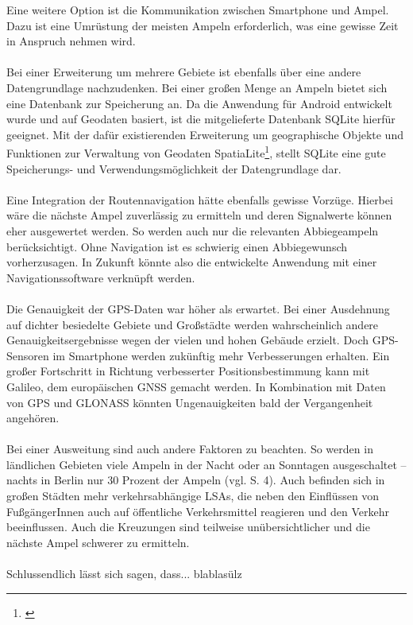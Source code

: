 Eine weitere Option ist die Kommunikation zwischen \gls{Smartphone} und Ampel. Dazu ist eine Umrüstung der meisten Ampeln erforderlich, was eine gewisse Zeit in Anspruch nehmen wird. \cite{smart_lsa}\\\\
Bei einer Erweiterung um mehrere Gebiete ist ebenfalls über eine andere Datengrundlage nachzudenken. Bei einer großen Menge an Ampeln bietet sich eine Datenbank zur Speicherung an.
Da die Anwendung für Android entwickelt wurde und auf Geodaten basiert, ist die mitgelieferte Datenbank SQLite hierfür geeignet. Mit der dafür existierenden Erweiterung um geographische Objekte und Funktionen zur Verwaltung von Geodaten SpatiaLite\footnote{\cite{sparta}}, stellt SQLite eine gute Speicherungs- und Verwendungsmöglichkeit der Datengrundlage dar.\\\\
Eine Integration der Routennavigation hätte ebenfalls gewisse Vorzüge. Hierbei wäre die nächste Ampel zuverlässig zu ermitteln und deren Signalwerte können eher ausgewertet werden. So werden auch nur die relevanten Abbiegeampeln berücksichtigt. Ohne Navigation ist es schwierig einen Abbiegewunsch vorherzusagen. In Zukunft könnte also die entwickelte Anwendung mit einer Navigationssoftware verknüpft werden.\\\\
Die Genauigkeit der \gls{GPS}-Daten war höher als erwartet. Bei einer Ausdehnung auf dichter besiedelte Gebiete und Großstädte werden wahrscheinlich andere Genauigkeitsergebnisse wegen der vielen und hohen Gebäude erzielt. Doch \gls{GPS}-Sensoren im \gls{Smartphone} werden zukünftig mehr Verbesserungen erhalten. 
Ein großer Fortschritt in Richtung verbesserter Positionsbestimmung kann mit Galileo, dem europäischen \gls{GNSS} gemacht werden. In Kombination mit Daten von \gls{GPS} und \gls{GLONASS} könnten Ungenauigkeiten bald der Vergangenheit angehören. \cite{gnss}\\\\
Bei einer Ausweitung sind auch andere Faktoren zu beachten. So werden in ländlichen Gebieten viele Ampeln in der Nacht oder an Sonntagen ausgeschaltet -- nachts in Berlin nur 30 Prozent der Ampeln (vgl. \cite{lsa_bln} S. 4). Auch befinden sich in großen Städten mehr verkehrsabhängige \glspl{LSA}, die neben den Einflüssen von FußgängerInnen auch auf öffentliche Verkehrsmittel reagieren und den Verkehr beeinflussen. Auch die Kreuzungen sind teilweise unübersichtlicher und die nächste Ampel schwerer zu ermitteln.\\\\
Schlussendlich lässt sich sagen, dass... blablasülz
